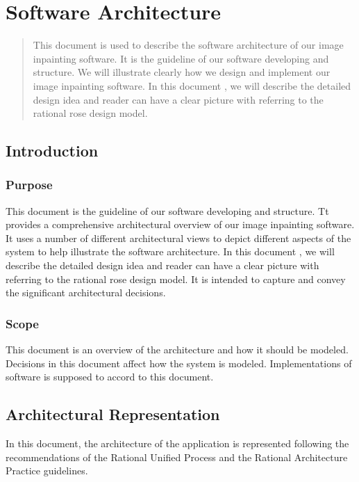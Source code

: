 \chapter{Software Architecture}
\begin{abstract}
\qquad This document is used to describe the software architecture of our image inpainting software. It is the guideline of our software developing and structure. We will illustrate clearly how we design and implement our image inpainting software. In this document , we will describe the detailed design idea and reader can have a clear picture with referring to the rational rose design model.\vspace{0.3cm}

\end{abstract}

\section{Introduction}
\subsection{Purpose}
\qquad This document is the guideline of our software developing and structure. Tt provides a comprehensive architectural overview of our image inpainting software.  It uses a number of different architectural views to depict different aspects of the system to help illustrate the software architecture. In this document , we will describe the detailed design idea and reader can have a clear picture with referring to the rational rose design model. It is intended to capture and convey the significant architectural decisions.
\subsection{Scope}
\qquad This document is an overview of the architecture and how it should be modeled. Decisions in this document affect how the system is modeled. Implementations of software is supposed to accord to this document.

\section{Architectural Representation}
\qquad In this document, the architecture of the application is represented following the recommendations of the Rational Unified Process and the Rational Architecture Practice guidelines. 

